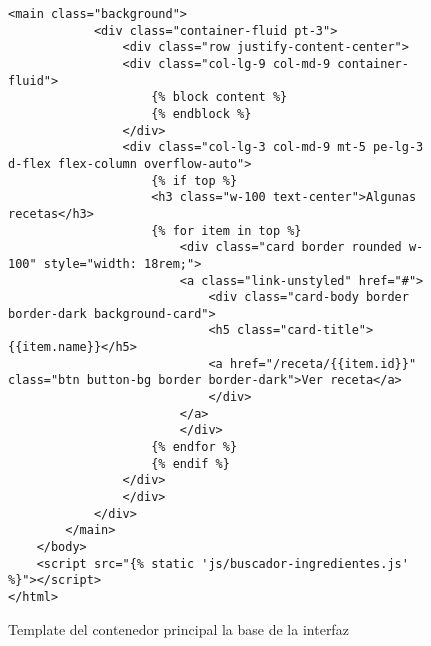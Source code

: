 \begin{figure}[H]
\begin{lstlisting}[style=consola]
        <main class="background">
            <div class="container-fluid pt-3">
                <div class="row justify-content-center">
                <div class="col-lg-9 col-md-9 container-fluid">
                    {% block content %}
                    {% endblock %}
                </div>
                <div class="col-lg-3 col-md-9 mt-5 pe-lg-3 d-flex flex-column overflow-auto">
                    {% if top %}
                    <h3 class="w-100 text-center">Algunas recetas</h3>
                    {% for item in top %}
                        <div class="card border rounded w-100" style="width: 18rem;">
                        <a class="link-unstyled" href="#">
                            <div class="card-body border border-dark background-card">
                            <h5 class="card-title">{{item.name}}</h5>
                            <a href="/receta/{{item.id}}" class="btn button-bg border border-dark">Ver receta</a>
                            </div>
                        </a>
                        </div>
                    {% endfor %}
                    {% endif %}
                </div>
                </div>
            </div>
        </main>
    </body>
    <script src="{% static 'js/buscador-ingredientes.js' %}"></script>
</html>
\end{lstlisting}
\caption{Template del contenedor principal la base de la \gls{interfaz}}
\label{sni:interfaz}
\end{figure}

